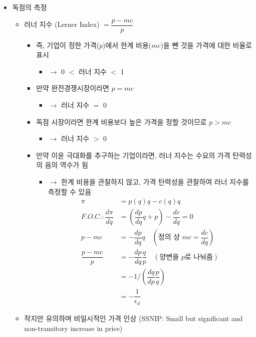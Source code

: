 \begin{itemize}
\begin{itemize}
\begin{itemize}
		\end{itemize}
	\end{itemize}
\item 독점의 측정
	\begin{itemize}
	\item 러너 지수 (Lerner Index) $= \dfrac{p-mc}{p}$
		\begin{itemize}
		\item 즉, 기업이 정한 가격($p$)에서 한계 비용($mc$)을 뺀 것을 가격에 대한 비율로 표시 
			\begin{itemize}
			\item $\rightarrow$ 0 $<$ 러너 지수 $<$ 1
			\end{itemize}
		\item 만약 완전경쟁시장이라면 $p = mc$ 
			\begin{itemize}
			\item $\rightarrow$ 러너 지수 $=$ 0
			\end{itemize}
		\item 독점 시장이라면 한계 비용보다 높은 가격을 정할 것이므로 $p > mc$ 
			\begin{itemize}
			\item $\rightarrow$ 러너 지수 $>$ 0
			\end{itemize}
		\item 만약 이윤 극대화를 추구하는 기업이라면, 러너 지수는 수요의 가격 탄력성의 음의 역수가 됨
			\begin{itemize}
			\item $\rightarrow$ 한계 비용을 관찰하지 않고, 가격 탄력성을 관찰하여 러너 지수를 측정할 수 있음
				\begin{align*}
				\pi & = p(q)q - c(q)q \\
				F.O.C.: \dfrac{d \pi}{d q} & = \left( \dfrac{d p}{d q} q + p \right) - \dfrac{d c}{d q}  = 0 \\
				p - mc & = - \dfrac{d p}{d q} q \quad \left( \text{정의 상 } mc = \dfrac{d c}{d q} \right) \\
				\dfrac{p - mc}{p} & = - \dfrac{d p}{d q} \dfrac{q}{p} \quad (\text{양변을 $p$로 나눠줌}) \\
				& = -1 / \left(  \dfrac{d q}{d p} \dfrac{p}{q} \right) \\
				& = - \dfrac{1}{\epsilon_{d}}
				\end{align*}
			\end{itemize}
		\end{itemize}
	\item 작지만 유의하며 비일시적인 가격 인상 (SSNIP: Small but significant and non-transitory increase in price) \citep{Johnson:1986ti}

\end{itemize}
\end{itemize}
